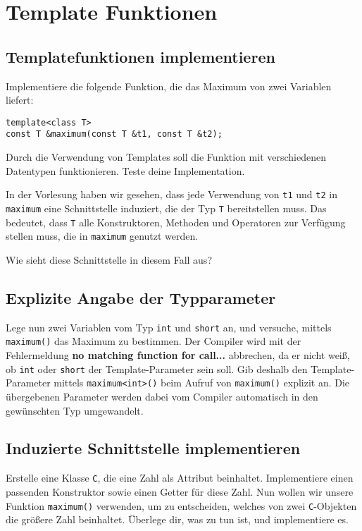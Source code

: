 \section{Template Funktionen}
\subsection{Templatefunktionen implementieren}
Implementiere die folgende Funktion, die das Maximum von zwei Variablen liefert:

\begin{lstlisting}
template<class T>
const T &maximum(const T &t1, const T &t2);
\end{lstlisting}

Durch die Verwendung von Templates soll die Funktion mit verschiedenen Datentypen funktionieren.
Teste deine Implementation.

In der Vorlesung haben wir gesehen, dass jede Verwendung von \texttt{t1} und \texttt{t2} in \texttt{maximum} eine Schnittstelle induziert, die der Typ \texttt{T} bereitstellen muss.
Das bedeutet, dass \texttt{T} alle Konstruktoren, Methoden und Operatoren zur Verfügung stellen muss, die in \texttt{maximum} genutzt werden.

Wie sieht diese Schnittstelle in diesem Fall aus?


\subsection{Explizite Angabe der Typparameter}
Lege nun zwei Variablen vom Typ \texttt{int} und \texttt{short} an, und versuche, mittels \texttt{maximum()} das Maximum zu bestimmen.
Der Compiler wird mit der Fehlermeldung \textbf{no matching function for call...} abbrechen, da er nicht weiß, ob \texttt{int} oder \texttt{short} der Template-Parameter sein soll.
Gib deshalb den Template-Parameter mittels \texttt{maximum<int>()} beim Aufruf von \texttt{maximum()} explizit an.
Die übergebenen Parameter werden dabei vom Compiler automatisch in den gewünschten Typ umgewandelt.

\subsection{Induzierte Schnittstelle implementieren}
Erstelle eine Klasse \texttt{C}, die eine Zahl als Attribut beinhaltet. Implementiere einen passenden Konstruktor sowie einen Getter für diese Zahl. Nun wollen wir unsere Funktion  \texttt{maximum()} verwenden, um zu entscheiden, welches von zwei \texttt{C}-Objekten die größere Zahl beinhaltet.
Überlege dir, was zu tun ist, und implementiere es.

